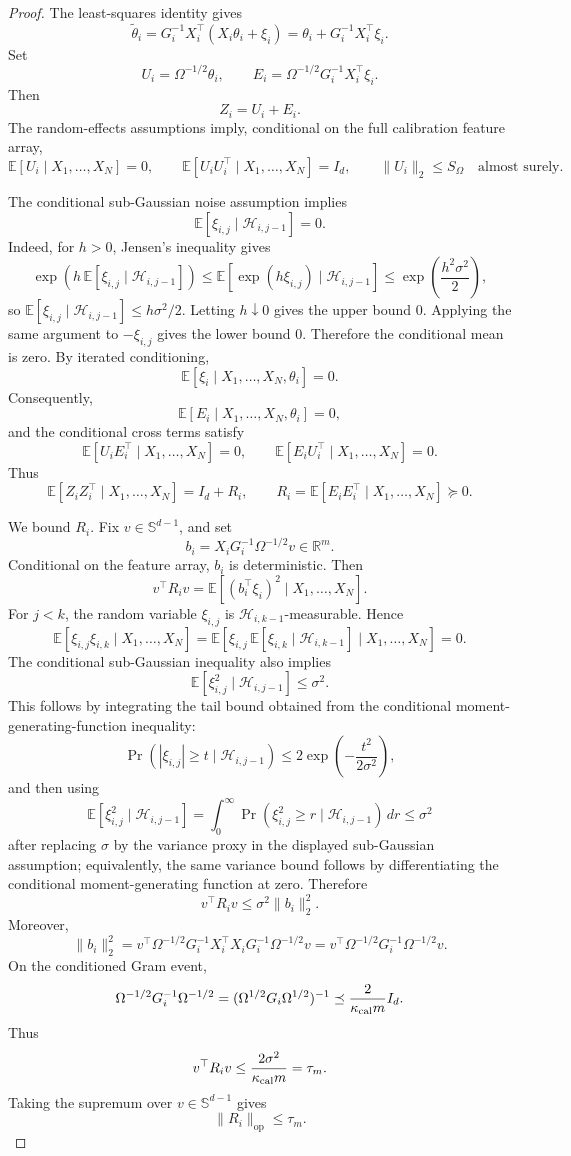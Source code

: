 \documentclass{article} %
\begin{document}
\begin{proof}
The least-squares identity gives
\[
\widetilde\theta_i
=
G_i^{-1}X_i^\top(X_i\theta_i+\xi_i)
=
\theta_i+G_i^{-1}X_i^\top\xi_i.
\]
Set
\[
U_i=\Omega^{-1/2}\theta_i,
\qquad
E_i=\Omega^{-1/2}G_i^{-1}X_i^\top\xi_i.
\]
Then
\[
Z_i=U_i+E_i.
\]
The random-effects assumptions imply, conditional on the full calibration
feature array,
\[
\mathbb{E}[U_i\mid X_1,\ldots,X_N]=0,
\qquad
\mathbb{E}[U_iU_i^\top\mid X_1,\ldots,X_N]=I_d,
\qquad
\|U_i\|_2\le S_\Omega
\quad\text{almost surely}.
\]

The conditional sub-Gaussian noise assumption implies
\[
\mathbb{E}[\xi_{i,j}\mid\mathcal{H}_{i,j-1}]=0.
\]
Indeed, for \(h>0\), Jensen's inequality gives
\[
\exp\!\left(h\,\mathbb{E}[\xi_{i,j}\mid\mathcal{H}_{i,j-1}]\right)
\le
\mathbb{E}\!\left[\exp(h\xi_{i,j})\mid\mathcal{H}_{i,j-1}\right]
\le
\exp\!\left(\frac{h^2\sigma^2}{2}\right),
\]
so \(\mathbb{E}[\xi_{i,j}\mid\mathcal{H}_{i,j-1}]\le h\sigma^2/2\).  Letting
\(h\downarrow0\) gives the upper bound \(0\).  Applying the same argument to
\(-\xi_{i,j}\) gives the lower bound \(0\).  Therefore the conditional mean is
zero.  By iterated conditioning,
\[
\mathbb{E}[\xi_i\mid X_1,\ldots,X_N,\theta_i]=0.
\]
Consequently,
\[
\mathbb{E}[E_i\mid X_1,\ldots,X_N,\theta_i]=0,
\]
and the conditional cross terms satisfy
\[
\mathbb{E}[U_iE_i^\top\mid X_1,\ldots,X_N]=0,
\qquad
\mathbb{E}[E_iU_i^\top\mid X_1,\ldots,X_N]=0.
\]
Thus
\[
\mathbb{E}[Z_iZ_i^\top\mid X_1,\ldots,X_N]
=
I_d+R_i,
\qquad
R_i=\mathbb{E}[E_iE_i^\top\mid X_1,\ldots,X_N]\succeq0.
\]

We bound \(R_i\).  Fix \(v\in\mathbb{S}^{d-1}\), and set
\[
b_i=X_iG_i^{-1}\Omega^{-1/2}v\in\mathbb{R}^m.
\]
Conditional on the feature array, \(b_i\) is deterministic.  Then
\[
v^\top R_i v
=
\mathbb{E}\!\left[(b_i^\top\xi_i)^2\mid X_1,\ldots,X_N\right].
\]
For \(j<k\), the random variable \(\xi_{i,j}\) is
\(\mathcal{H}_{i,k-1}\)-measurable.  Hence
\[
\mathbb{E}[\xi_{i,j}\xi_{i,k}\mid X_1,\ldots,X_N]
=
\mathbb{E}\!\left[
\xi_{i,j}\,
\mathbb{E}[\xi_{i,k}\mid\mathcal{H}_{i,k-1}]
\mid X_1,\ldots,X_N
\right]
=
0.
\]
The conditional sub-Gaussian inequality also implies
\[
\mathbb{E}[\xi_{i,j}^2\mid\mathcal{H}_{i,j-1}]\le \sigma^2.
\]
This follows by integrating the tail bound obtained from the conditional
moment-generating-function inequality:
\[
\Pr(|\xi_{i,j}|\ge t\mid\mathcal{H}_{i,j-1})
\le
2\exp\!\left(-\frac{t^2}{2\sigma^2}\right),
\]
and then using
\[
\mathbb{E}[\xi_{i,j}^2\mid\mathcal{H}_{i,j-1}]
=
\int_0^\infty
\Pr(\xi_{i,j}^2\ge r\mid\mathcal{H}_{i,j-1})\,dr
\le
\sigma^2
\]
after replacing \(\sigma\) by the variance proxy in the displayed
sub-Gaussian assumption; equivalently, the same variance bound follows by
differentiating the conditional moment-generating function at zero.  Therefore
\[
v^\top R_i v
\le
\sigma^2\|b_i\|_2^2.
\]
Moreover,
\[
\|b_i\|_2^2
=
v^\top\Omega^{-1/2}G_i^{-1}X_i^\top X_iG_i^{-1}\Omega^{-1/2}v
=
v^\top\Omega^{-1/2}G_i^{-1}\Omega^{-1/2}v.
\]
On the conditioned Gram event,
\[
\Omega^{-1/2}G_i^{-1}\Omega^{-1/2}
=
(\Omega^{1/2}G_i\Omega^{1/2})^{-1}
\preceq
\frac{2}{\kappa_{\rm cal}m}I_d.
\]
Thus
\[
v^\top R_i v
\le
\frac{2\sigma^2}{\kappa_{\rm cal}m}
=
\tau_m.
\]
Taking the supremum over \(v\in\mathbb{S}^{d-1}\) gives
\[
\|R_i\|_{\mathrm{op}}\le\tau_m.
\]


\end{proof}
\end{document}
